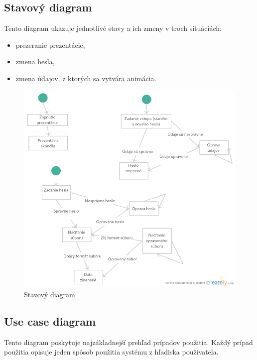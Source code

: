 \documentclass[12pt,a4paper]{report}
\begin{document}
\subsection[Stavový diagram]{\rmfamily\bfseries
	Stavový diagram}
Tento diagram ukazuje jednotlivé stavy a ich zmeny v troch situáciách:
\begin{itemize}
	\item prezeranie prezentácie,
	\item zmena hesla,
	\item zmena údajov, z ktorých sa vytvára animácia.
\end{itemize}
\begin{figure}[htb]
	\centering
	\includegraphics[scale=0.5]{Stavovy_diagram}
	\caption{Stavový diagram}
	\label{fig:Stavový diagram}
\end{figure}
\FloatBarrier
\clearpage
\subsection[Use case diagram]{\rmfamily\bfseries
	Use case diagram}
Tento diagram poskytuje najzákladnejší prehľad prípadov použitia. Každý prípad použitia opisuje jeden spôsob použitia systému z hľadiska používateľa.
\end{document}
